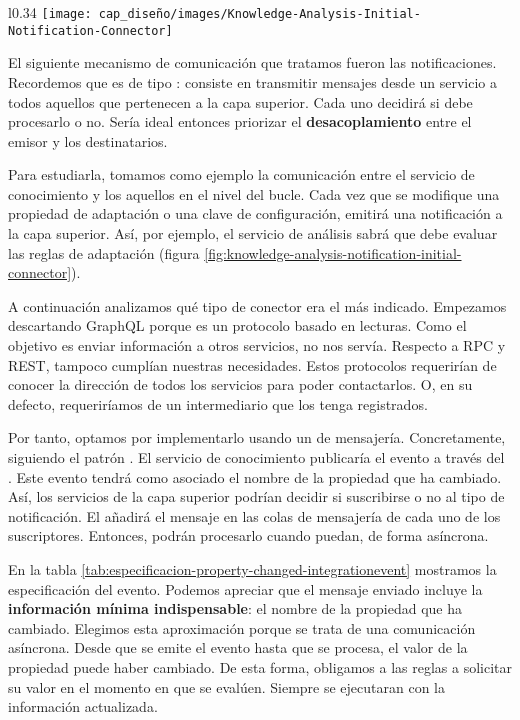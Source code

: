 \begin{wrapfigure}{l}{0.34\linewidth}
  \centering
  \texttt{[image: cap\_diseño/images/Knowledge-Analysis-Initial-Notification-Connector]}
  \caption{Representación inicial del conector entre el servicio de conocimiento y el de análisis.}
  \label{fig:knowledge-analysis-notification-initial-connector}
  \vspace{-10pt}
\end{wrapfigure}

El siguiente mecanismo de comunicación que tratamos fueron las notificaciones. Recordemos que es de tipo \textbf{}: consiste en transmitir mensajes desde un servicio a todos aquellos que pertenecen a la capa superior. Cada uno decidirá si debe procesarlo o no. Sería ideal entonces priorizar el \textbf{desacoplamiento} entre el emisor y los destinatarios.

Para estudiarla, tomamos como ejemplo la comunicación entre el servicio de conocimiento y los aquellos en el nivel del bucle. Cada vez que se modifique una propiedad de adaptación o una clave de configuración, emitirá una notificación a la capa superior. Así, por ejemplo, el servicio de análisis sabrá que debe evaluar las reglas de adaptación (figura \ref{fig:knowledge-analysis-notification-initial-connector}).

A continuación analizamos qué tipo de conector era el más indicado. Empezamos descartando GraphQL porque es un protocolo basado en lecturas. Como el objetivo es enviar información a otros servicios, no nos servía. Respecto a RPC y REST, tampoco cumplían nuestras necesidades. Estos protocolos requerirían de conocer la dirección de todos los servicios para poder contactarlos. O, en su defecto, requeriríamos de un intermediario que los tenga registrados.

Por tanto, optamos por implementarlo usando un  de mensajería. Concretamente, siguiendo el patrón \textbf{}. El servicio de conocimiento publicaría el evento a través del . Este evento tendrá como  asociado el nombre de la propiedad que ha cambiado. Así, los servicios de la capa superior podrían decidir si suscribirse o no al tipo de notificación. El  añadirá el mensaje en las colas de mensajería de cada uno de los suscriptores. Entonces, podrán procesarlo cuando puedan, de forma asíncrona.

En la tabla \ref{tab:especificacion-property-changed-integrationevent} mostramos la especificación del evento. Podemos apreciar que el mensaje enviado incluye la \textbf{información mínima indispensable}: el nombre de la propiedad que ha cambiado. Elegimos esta aproximación porque se trata de una comunicación asíncrona. Desde que se emite el evento hasta que se procesa, el valor de la propiedad puede haber cambiado. De esta forma, obligamos a las reglas a solicitar su valor en el momento en que se evalúen. Siempre se ejecutaran con la información actualizada.

